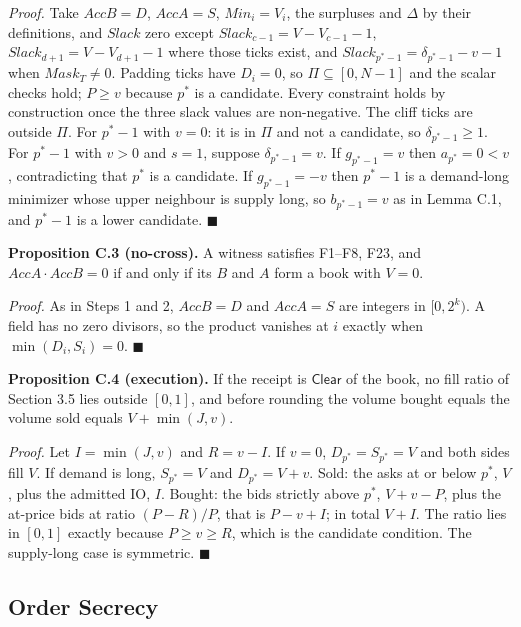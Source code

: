 \emph{Proof.} Take \(AccB = D\), \(AccA = S\), \(Min_i = V_i\), the surpluses and \(\Delta\) by their definitions, and \(Slack\) zero except \(Slack_{c-1} = V - V_{c-1} - 1\), \(Slack_{d+1} = V - V_{d+1} - 1\) where those ticks exist, and \(Slack_{p^*-1} = \delta_{p^*-1} - v - 1\) when \(Mask_T \ne 0\). Padding ticks have \(D_i = 0\), so \(\Pi \subseteq [0, N-1]\) and the scalar checks hold; \(P \ge v\) because \(p^*\) is a candidate. Every constraint holds by construction once the three slack values are non-negative. The cliff ticks are outside \(\Pi\). For \(p^* - 1\) with \(v = 0\): it is in \(\Pi\) and not a candidate, so \(\delta_{p^*-1} \ge 1\). For \(p^* - 1\) with \(v > 0\) and \(s = 1\), suppose \(\delta_{p^*-1} = v\). If \(g_{p^*-1} = v\) then \(a_{p^*} = 0 < v\), contradicting that \(p^*\) is a candidate. If \(g_{p^*-1} = -v\) then \(p^* - 1\) is a demand-long minimizer whose upper neighbour is supply long, so \(b_{p^*-1} = v\) as in Lemma C.1, and \(p^* - 1\) is a lower candidate. \(\blacksquare\)

\textbf{Proposition C.3 (no-cross).} A witness satisfies F1--F8, F23, and \(AccA \cdot AccB = 0\) if and only if its \(B\) and \(A\) form a book with \(V = 0\).

\emph{Proof.} As in Steps 1 and 2, \(AccB = D\) and \(AccA = S\) are integers in \([0, 2^k)\). A field has no zero divisors, so the product vanishes at \(i\) exactly when \(\min(D_i, S_i) = 0\). \(\blacksquare\)

\textbf{Proposition C.4 (execution).} If the receipt is \(\mathsf{Clear}\) of the book, no fill ratio of Section 3.5 lies outside \([0,1]\), and before rounding the volume bought equals the volume sold equals \(V + \min(J, v)\).

\emph{Proof.} Let \(I = \min(J, v)\) and \(R = v - I\). If \(v = 0\), \(D_{p^*} = S_{p^*} = V\) and both sides fill \(V\). If demand is long, \(S_{p^*} = V\) and \(D_{p^*} = V + v\). Sold: the asks at or below \(p^*\), \(V\), plus the admitted IO, \(I\). Bought: the bids strictly above \(p^*\), \(V + v - P\), plus the at-price bids at ratio \((P - R)/P\), that is \(P - v + I\); in total \(V + I\). The ratio lies in \([0, 1]\) exactly because \(P \ge v \ge R\), which is the candidate condition. The supply-long case is symmetric. \(\blacksquare\)

\subsection{Order Secrecy}

